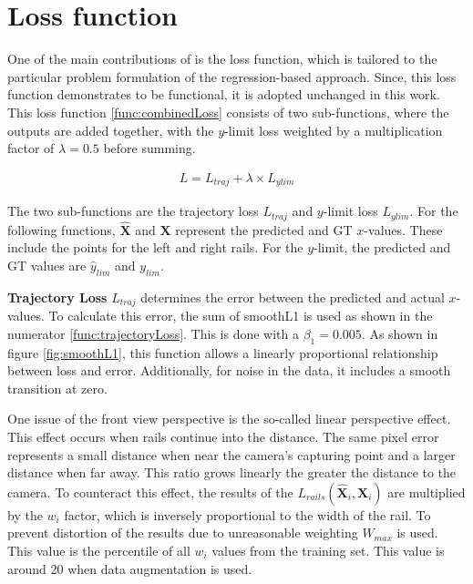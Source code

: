 \section{Loss function}
\label{sec:lossFunction}

One of the main contributions of \cite{tepNet2024} is the loss function, which is tailored to the particular problem formulation of the regression-based approach.
Since, this loss function demonstrates to be functional, it is adopted unchanged in this work.
This loss function \autoref{func:combinedLoss} \cite{tepNet2024} consists of two sub-functions, where the outputs are added together, with the $y$-limit loss weighted by a multiplication factor of $\lambda=0.5$ before summing.

\begin{align}
    L = L_{traj} + \lambda \times L_{ylim}
    \label{func:combinedLoss}
\end{align}

The two sub-functions are the trajectory loss $L_{traj}$ and $y$-limit loss $L_{ylim}$.
For the following functions, $\hat{\mathbf{X}}$ and $\mathbf{X}$ represent the predicted and \ac{GT} $x$-values.
These include the points for the left and right rails.
For the $y$-limit, the predicted and \ac{GT} values are $\hat{y}_{lim}$ and $y_{lim}$.

\vspace{1cm}

\noindent \textbf{Trajectory Loss} $L_{traj}$ determines the error between the predicted and actual $x$-values.
To calculate this error, the sum of smoothL1 is used as shown in the numerator \autoref{func:trajectoryLoss}.
This is done with a $\beta_{1} = 0.005$. As shown in figure \autoref{fig:smoothL1}, this function allows a linearly proportional relationship between loss and error.
Additionally, for noise in the data, it includes a smooth transition at zero.

One issue of the front view perspective is the so-called linear perspective effect.
This effect occurs when rails continue into the distance.
The same pixel error represents a small distance when near the camera's capturing point and a larger distance when far away.
This ratio grows linearly the greater the distance to the camera.
To counteract this effect, the results of the $L_{rails}(\hat{\mathbf{X}}_{i},\mathbf{X}_{i})$ are multiplied by the $w_{i}$ factor, which is inversely proportional to the width of the rail.
To prevent distortion of the results due to unreasonable weighting $W_{max}$ is used.
This value is the %
percentile of all $w_{i}$ values from the training set.
This value is around 20 when data augmentation is used.

